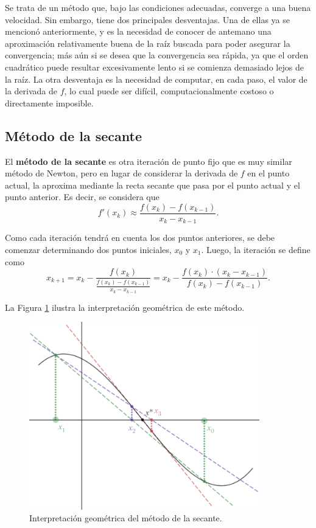 Se trata de un método que, bajo las condiciones adecuadas, converge a una
buena velocidad. Sin embargo, tiene dos principales desventajas. Una de ellas
ya se mencionó anteriormente, y es la necesidad de conocer de antemano una
aproximación relativamente buena de la raíz buscada para poder asegurar la
convergencia; más aún si se desea que la convergencia sea rápida, ya que
el orden cuadrático puede resultar excesivamente lento si se comienza demasiado
lejos de la raíz. La otra desventaja es la necesidad de computar, en cada
paso, el valor de la derivada de $f$, lo cual puede ser difícil,
computacionalmente costoso o directamente imposible.

\subsection{Método de la secante}
El \textbf{método de la secante} es otra iteración de punto fijo que es
muy similar método de Newton, pero en lugar de considerar
la derivada de $f$ en el punto actual, la aproxima mediante la recta secante
que pasa por el punto actual y el punto anterior. Es decir, se considera que
\[ f'(x_k) \approx \frac{f(x_k) - f(x_{k-1})}{x_k - x_{k-1}}. \]

Como cada iteración tendrá en cuenta los dos puntos anteriores, se debe
comenzar determinando dos puntos iniciales, $x_0$ y $x_1$. Luego, la iteración
se define como
\[ x_{k+1} = x_k - \frac{f(x_k)}{\frac{f(x_k) - f(x_{k-1})}{x_k - x_{k-1}}}
           = x_k - \frac{f(x_k) \cdot (x_k - x_{k-1})}{f(x_k) - f(x_{k-1})}. \]

La Figura \ref{fig:secante} ilustra la interpretación geométrica de este
método.

\begin{figure}[H]
\centering
\includegraphics[width=10cm]{secante.png}
\caption{Interpretación geométrica del método de la secante.}
\label{fig:secante}
\end{figure}

